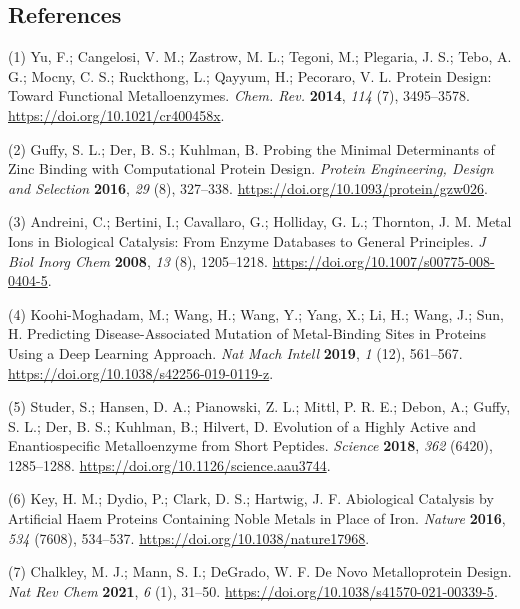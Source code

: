 \documentclass[  ASAPversion,
  ,
  9pt]{elife}
\newenvironment{cslreferences}%
  {}%
  {\par}
\begin{document}
\hypertarget{references}{%
\subsection{References}\label{references}}

\hypertarget{refs}{}
\begin{cslreferences}
\leavevmode\hypertarget{ref-gxiv5uTU}{}%
(1) Yu, F.; Cangelosi, V. M.; Zastrow, M. L.; Tegoni, M.; Plegaria, J. S.; Tebo, A. G.; Mocny, C. S.; Ruckthong, L.; Qayyum, H.; Pecoraro, V. L. Protein Design: Toward Functional Metalloenzymes. \emph{Chem. Rev.} \textbf{2014}, \emph{114} (7), 3495--3578. \url{https://doi.org/10.1021/cr400458x}.

\leavevmode\hypertarget{ref-LY9UGI7}{}%
(2) Guffy, S. L.; Der, B. S.; Kuhlman, B. Probing the Minimal Determinants of Zinc Binding with Computational Protein Design. \emph{Protein Engineering, Design and Selection} \textbf{2016}, \emph{29} (8), 327--338. \url{https://doi.org/10.1093/protein/gzw026}.

\leavevmode\hypertarget{ref-iqbHG3rv}{}%
(3) Andreini, C.; Bertini, I.; Cavallaro, G.; Holliday, G. L.; Thornton, J. M. Metal Ions in Biological Catalysis: From Enzyme Databases to General Principles. \emph{J Biol Inorg Chem} \textbf{2008}, \emph{13} (8), 1205--1218. \url{https://doi.org/10.1007/s00775-008-0404-5}.

\leavevmode\hypertarget{ref-4sXp2sDw}{}%
(4) Koohi-Moghadam, M.; Wang, H.; Wang, Y.; Yang, X.; Li, H.; Wang, J.; Sun, H. Predicting Disease-Associated Mutation of Metal-Binding Sites in Proteins Using a Deep Learning Approach. \emph{Nat Mach Intell} \textbf{2019}, \emph{1} (12), 561--567. \url{https://doi.org/10.1038/s42256-019-0119-z}.

\leavevmode\hypertarget{ref-oOm5j05D}{}%
(5) Studer, S.; Hansen, D. A.; Pianowski, Z. L.; Mittl, P. R. E.; Debon, A.; Guffy, S. L.; Der, B. S.; Kuhlman, B.; Hilvert, D. Evolution of a Highly Active and Enantiospecific Metalloenzyme from Short Peptides. \emph{Science} \textbf{2018}, \emph{362} (6420), 1285--1288. \url{https://doi.org/10.1126/science.aau3744}.

\leavevmode\hypertarget{ref-LAjO1aDL}{}%
(6) Key, H. M.; Dydio, P.; Clark, D. S.; Hartwig, J. F. Abiological Catalysis by Artificial Haem Proteins Containing Noble Metals in Place of Iron. \emph{Nature} \textbf{2016}, \emph{534} (7608), 534--537. \url{https://doi.org/10.1038/nature17968}.

\leavevmode\hypertarget{ref-13w4SiWCx}{}%
(7) Chalkley, M. J.; Mann, S. I.; DeGrado, W. F. De Novo Metalloprotein Design. \emph{Nat Rev Chem} \textbf{2021}, \emph{6} (1), 31--50. \url{https://doi.org/10.1038/s41570-021-00339-5}.


\end{cslreferences}
\end{document}
